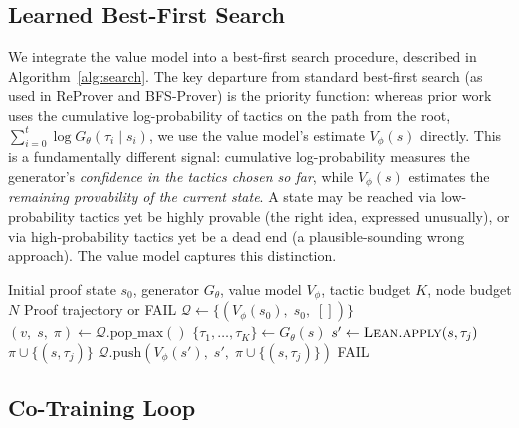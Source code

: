 \documentclass{article}
\begin{document}
\subsection{Learned Best-First Search}
\label{sec:search}

We integrate the value model into a best-first search procedure, described in Algorithm~\ref{alg:search}. The key departure from standard best-first search (as used in ReProver and BFS-Prover) is the priority function: whereas prior work uses the cumulative log-probability of tactics on the path from the root, $\sum_{i=0}^{t} \log G_\theta(\tau_i \mid s_i)$, we use the value model's estimate $V_\phi(s)$ directly. This is a fundamentally different signal: cumulative log-probability measures the generator's \emph{confidence in the tactics chosen so far}, while $V_\phi(s)$ estimates the \emph{remaining provability of the current state}. A state may be reached via low-probability tactics yet be highly provable (the right idea, expressed unusually), or via high-probability tactics yet be a dead end (a plausible-sounding wrong approach). The value model captures this distinction.

\begin{algorithm}[t]
\caption{Learned Best-First Search}
\label{alg:search}
\begin{algorithmic}[1]
\REQUIRE Initial proof state $s_0$, generator $G_\theta$, value model $V_\phi$, tactic budget $K$, node budget $N$
\ENSURE Proof trajectory or FAIL
\STATE $\mathcal{Q} \leftarrow \{(V_\phi(s_0),\; s_0,\; [])\}$ 
    \STATE $(v,\; s,\; \pi) \leftarrow \mathcal{Q}.\text{pop\_max}()$ 
    \STATE $\{\tau_1, \ldots, \tau_K\} \leftarrow G_\theta(s)$ 
        \STATE $s' \leftarrow \textsc{Lean.apply}(s, \tau_j)$
            \RETURN $\pi \cup \{(s, \tau_j)\}$ 
            \STATE $\mathcal{Q}.\text{push}(V_\phi(s'),\; s',\; \pi \cup \{(s, \tau_j)\})$
        \ENDIF
    \ENDFOR
\ENDFOR
\RETURN FAIL
\end{algorithmic}
\end{algorithm}

\subsection{Co-Training Loop}
\label{sec:cotraining}
\end{document}
